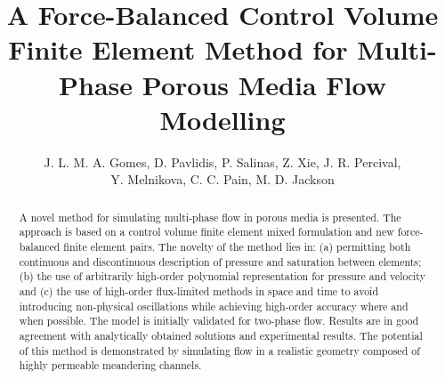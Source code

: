 \documentclass[times]{fldauth}
\begin{document}
\address{ Novel Reservoir Modelling and Simulation Group, Department of Earth Science and Engineering, Imperial College London, UK. \\ Applied Modelling and Computation Group, Department of Earth Science and Engineering, Imperial College London, UK. \\  Environmental and Industrial Fluid Mechanics Group, School of Engineering, University of Aberdeen, UK.}


\title{A Force-Balanced Control Volume Finite Element Method for Multi-Phase Porous Media Flow Modelling}


\author{J. L. M. A. Gomes, D. Pavlidis\corrauth{}, P. Salinas, Z. Xie, J. R. Percival, \\Y. Melnikova, C. C. Pain, M. D. Jackson}


\begin{abstract}
  A novel method for simulating multi-phase flow in porous media is
  presented. The approach is based on a control volume finite element
  mixed formulation and new force-balanced finite element pairs. The
  novelty of the method lies in: (a) permitting both continuous and
  discontinuous description of pressure and saturation between
  elements; (b) the use of arbitrarily high-order polynomial
  representation for pressure and velocity and (c) the use of
  high-order flux-limited methods in space and time to avoid
  introducing non-physical oscillations while achieving high-order
  accuracy where and when possible. The model is initially validated
  for two-phase flow. Results are in good agreement with analytically
  obtained solutions and experimental results. The potential of this
  method is demonstrated by simulating flow in a realistic geometry
  composed of highly permeable meandering channels.
\end{abstract}


\maketitle
\end{document}
